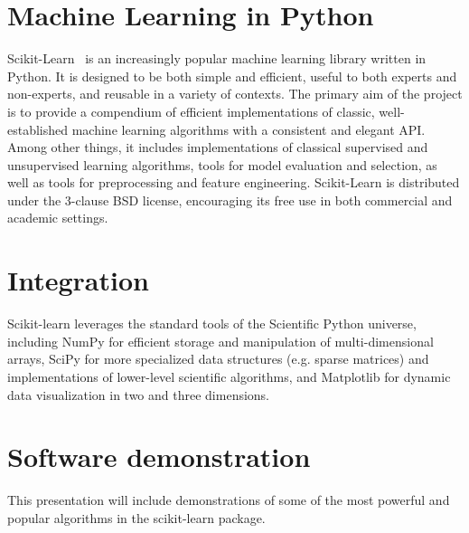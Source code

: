 \documentclass{article}
\begin{document}

\section*{Machine Learning in Python}

Scikit-Learn~\citep{pedregosa2011} is an increasingly popular machine learning
library written in Python.  It is designed to be both  simple and efficient,
useful to both experts and non-experts, and reusable in a variety of contexts.
The  primary aim of the project is to provide a compendium of efficient
implementations of classic, well-established  machine learning algorithms with
a consistent and elegant API. Among other things, it includes implementations
of classical supervised and unsupervised learning algorithms, tools for model
evaluation and selection, as  well as tools for preprocessing and feature
engineering. Scikit-Learn is distributed under the 3-clause  BSD license,
encouraging its free use in both commercial and academic settings.


\section*{Integration}

Scikit-learn leverages the standard tools of the Scientific Python universe,
including NumPy for efficient  storage and manipulation of multi-dimensional
arrays, SciPy for more specialized data structures  (e.g. sparse matrices) and
implementations of lower-level scientific algorithms, and Matplotlib for
dynamic data visualization in two and three dimensions.


\section*{Software demonstration}

This presentation will include demonstrations of some of the most powerful and
popular algorithms in the  scikit-learn package.



\end{document}
